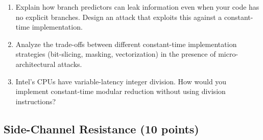 \documentclass[10pt,a4paper,american]{exam}
\begin{document}
\begin{enumerate}
	      \begin{enumerate}
		      \item Explain how branch predictors can leak information even when your code has no explicit branches. Design an attack that exploits this against a constant-time implementation.
		      \item Analyze the trade-offs between different constant-time implementation strategies (bit-slicing, masking, vectorization) in the presence of micro-architectural attacks.
		      \item Intel's CPUs have variable-latency integer division. How would you implement constant-time modular reduction without using division instructions?
	      \end{enumerate}
\end{enumerate}

\subsection{Side-Channel Resistance (10 points)}
\end{document}

